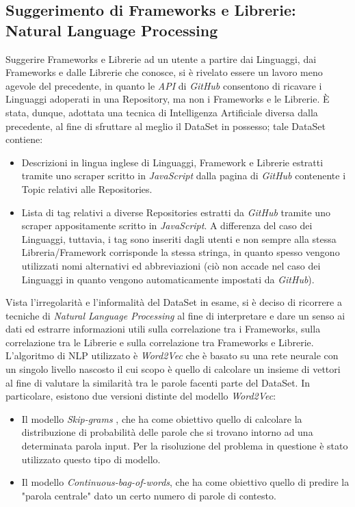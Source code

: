 \subsection{Suggerimento di Frameworks e Librerie: Natural Language Processing}
Suggerire Frameworks e Librerie ad un utente a partire dai Linguaggi, dai Frameworks e dalle Librerie che conosce, si è rivelato essere un lavoro meno agevole del precedente, in quanto le \emph{API} di \emph{GitHub} consentono di ricavare i Linguaggi adoperati in una Repository, ma non i Frameworks e le Librerie. È stata, dunque, adottata una tecnica di Intelligenza Artificiale diversa dalla precedente, al fine di sfruttare al meglio il DataSet in possesso; tale DataSet contiene:
\begin{itemize}
    \item Descrizioni in lingua inglese di Linguaggi, Framework e Librerie estratti tramite uno scraper scritto in \emph{JavaScript} dalla pagina di \emph{GitHub} contenente i Topic relativi alle Repositories. 
    \item Lista di tag relativi a diverse Repositories estratti da \emph{GitHub} tramite uno scraper appositamente scritto in \emph{JavaScript}. A differenza del caso dei Linguaggi, tuttavia, i tag sono inseriti dagli utenti e non sempre alla stessa Libreria/Framework corrisponde la stessa stringa, in quanto spesso vengono utilizzati nomi alternativi ed abbreviazioni (ciò non accade nel caso dei Linguaggi in quanto vengono automaticamente impostati da \emph{GitHub}). 
\end{itemize}
Vista l'irregolarità e l'informalità del DataSet in esame, si è deciso di ricorrere a tecniche di \emph{Natural Language Processing} al fine di interpretare e dare un senso ai dati ed estrarre informazioni utili sulla correlazione tra i Frameworks, sulla correlazione tra le Librerie e sulla correlazione tra Frameworks e Librerie.\\
L'algoritmo di NLP utilizzato è \emph{Word2Vec} \cite{Word2Vec} che è basato su una rete neurale con un singolo livello nascosto il cui scopo è quello di calcolare un insieme di vettori al fine di valutare la similarità tra le parole facenti parte del DataSet. In particolare, esistono due versioni distinte del modello \emph{Word2Vec}:
\begin{itemize}
    \item Il modello \emph{Skip-grams} \cite{SkipGram}, che ha come obiettivo quello di calcolare la distribuzione di probabilità delle parole che si trovano intorno ad una determinata parola input. Per la risoluzione del problema in questione è stato utilizzato questo tipo di modello.
    \item Il modello \emph{Continuous-bag-of-words}, che ha come obiettivo quello di predire la "parola centrale" dato un certo numero di parole di contesto. 
\end{itemize}
